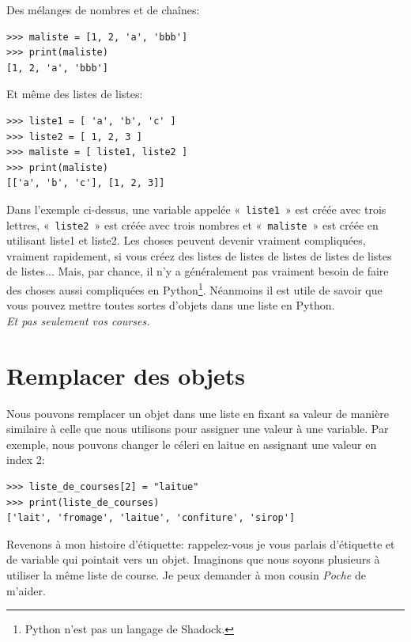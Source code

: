 Des mélanges de nombres et de chaînes:

\begin{Verbatim}[frame=single,rulecolor=\color{mbleu}, label=à taper]
>>> maliste = [1, 2, 'a', 'bbb']
>>> print(maliste)
[1, 2, 'a', 'bbb']
\end{Verbatim}


Et même des listes de listes:

\begin{Verbatim}[frame=single,rulecolor=\color{mbleu}, label=à taper]
>>> liste1 = [ 'a', 'b', 'c' ]
>>> liste2 = [ 1, 2, 3 ]
>>> maliste = [ liste1, liste2 ]
>>> print(maliste)
[['a', 'b', 'c'], [1, 2, 3]]
\end{Verbatim}

Dans l'exemple ci-dessus, une variable appelée «~\texttt{liste1}~» est créée avec trois lettres, «~\texttt{liste2}~» est créée avec trois nombres et «~\texttt{maliste}~» est créée en utilisant liste1 et liste2. 
Les choses peuvent devenir vraiment compliquées, vraiment rapidement, si vous créez des listes de listes de listes de listes de listes de listes... Mais, par chance, il n'y a généralement pas vraiment besoin de faire des choses  aussi compliquées en Python\footnote{Python n'est pas un langage de Shadock.}. Néanmoins il est utile de savoir que vous pouvez mettre toutes sortes d'objets dans une liste en Python.\\

\emph{Et pas seulement vos courses.}\\

\section*{Remplacer des objets}

Nous pouvons remplacer un objet dans une liste en fixant sa valeur de manière similaire à celle que nous utilisons pour assigner une valeur à une variable. Par exemple, nous pouvons changer le céleri en laitue en assignant une valeur en index 2:\\

\begin{Verbatim}[frame=single,rulecolor=\color{mbleu}, label=à taper]
>>> liste_de_courses[2] = "laitue"
>>> print(liste_de_courses)
['lait', 'fromage', 'laitue', 'confiture', 'sirop']
\end{Verbatim}

Revenons à mon histoire d'étiquette: rappelez-vous je vous parlais d'étiquette et de variable qui pointait vers un objet. Imaginons que nous soyons plusieurs à utiliser la même liste de course. Je peux demander à mon cousin \emph{Poche} de m'aider.

